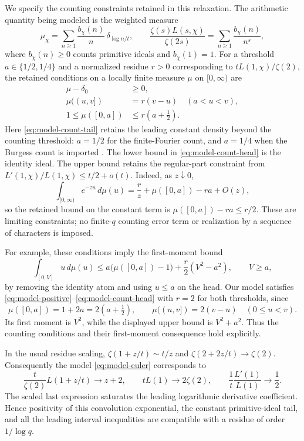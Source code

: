 \documentclass[11pt]{article}
\begin{document}
We specify the counting constraints retained in this relaxation.
The arithmetic quantity being modeled is the weighted measure
\[
 \mu_\chi=\sum_{n\ge1}\frac{b_\chi(n)}n\,
                \delta_{\log n/t},\qquad
 \frac{\zeta(s)L(s,\chi)}{\zeta(2s)}
       =\sum_{n\ge1}\frac{b_\chi(n)}{n^s},
\]
where $b_\chi(n)\ge0$ counts primitive ideals and $b_\chi(1)=1$.
For a threshold $a\in\{1/2,1/4\}$ and a normalized residue $r>0$
corresponding to $tL(1,\chi)/\zeta(2)$, the retained conditions on
a locally finite measure $\mu$ on $[0,\infty)$ are
\begin{align}
 \mu-\delta_0&\ge0,\label{eq:model-positive}\\
 \mu((u,v])&=r(v-u)\quad(a<u<v),\label{eq:model-count-tail}\\
 1\le\mu([0,a])&\le r(a+\tfrac12).\label{eq:model-count-head}
\end{align}
Here \eqref{eq:model-count-tail} retains the leading constant density
beyond the counting threshold: $a=1/2$ for the finite-Fourier count,
and $a=1/4$ when the Burgess count is imported
\cite[Appendices C.5--C.6, (C15) and (C22)]{cairn}.
The lower bound in \eqref{eq:model-count-head} is the identity ideal.
The upper bound retains the regular-part constraint from
$L'(1,\chi)/L(1,\chi)\le t/2+o(t)$. Indeed, as $z\downarrow0$,
\[
 \int_{[0,\infty)}e^{-zu}\,d\mu(u)
 =\frac rz+\mu([0,a])-ra+O(z),
\]
so the retained bound on the constant term is
$\mu([0,a])-ra\le r/2$.
These are limiting constraints; no finite-$q$ counting error term
or realization by a sequence of characters is imposed.

For example, these conditions imply the first-moment bound
\[
 \int_{[0,V]}u\,d\mu(u)
 \le a\bigl(\mu([0,a])-1\bigr)
       +\frac r2(V^2-a^2),\qquad V\ge a,
\]
by removing the identity atom and using $u\le a$ on the head.
Our model satisfies \eqref{eq:model-positive}--\eqref{eq:model-count-head}
with $r=2$ for both thresholds, since
\[
 \mu([0,a])=1+2a=2(a+\tfrac12),\qquad
 \mu((u,v])=2(v-u)\quad(0\le u<v).
\]
Its first moment is $V^2$, while the displayed upper bound is
$V^2+a^2$. Thus the counting conditions and their first-moment
consequence hold explicitly.

In the usual residue scaling,
$\zeta(1+z/t)\sim t/z$ and $\zeta(2+2z/t)\to\zeta(2)$.
Consequently the model \eqref{eq:model-euler} corresponds to
\[
 \frac{t}{\zeta(2)}L(1+z/t)\longrightarrow z+2,
 \qquad tL(1)\longrightarrow2\zeta(2),
 \qquad \frac1t\frac{L'(1)}{L(1)}\longrightarrow\frac12.
\]
The scaled last expression saturates the leading logarithmic
derivative coefficient. Hence positivity of this convolution
exponential, the constant primitive-ideal tail, and all the leading
interval inequalities are compatible with a residue of order
$1/\log q$.
\end{document}
